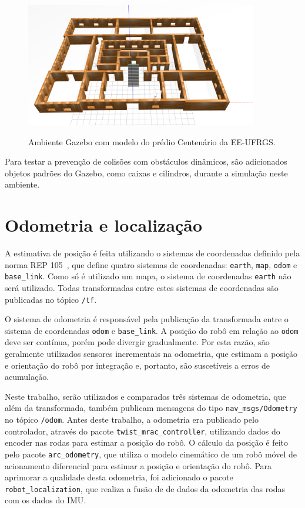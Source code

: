 \documentclass[repeatfields,xlists,xpacks,oneside,yearsonly]{ufrgscca}
\begin{document}
\begin{figure}[h]
    {
        \centering
        \caption{Ambiente Gazebo com modelo do prédio Centenário da EE-UFRGS.}
        \label{fig:gazebo_centenario}
        \includegraphics[width=0.9\textwidth]{gazebo.png}\\
    }
\end{figure}

Para testar a prevenção de colisões com obstáculos dinâmicos, são
adicionados objetos padrões do Gazebo, como caixas e cilindros,
durante a simulação neste ambiente.

\section{Odometria e localização}

A estimativa de posição é feita utilizando o sistemas de coordenadas definido pela
norma REP 105~\cite{rep_105}, que define quatro sistemas de coordenadas: \texttt{earth}, 
\texttt{map}, \texttt{odom} e \texttt{base\_link}.
Como só é utilizado um mapa, o sistema de coordenadas \texttt{earth} não será utilizado.
Todas transformadas entre estes sistemas de coordenadas são
publicadas no tópico \texttt{/tf}.

O sistema de odometria é responsável pela publicação da transformada entre o sistema
de coordenadas \texttt{odom} e \texttt{base\_link}. 
A posição do robô em relação ao \texttt{odom} deve ser contínua, porém pode divergir
gradualmente. Por esta razão, são geralmente utilizados sensores incrementais na 
odometria, que estimam a posição e orientação do robô por integração e, portanto,
são suscetíveis a erros de acumulação.

Neste trabalho, serão utilizados e comparados três sistemas de odometria, 
que além da transformada, também publicam mensagens do tipo 
\texttt{nav\_msgs/Odometry} no tópico \texttt{/odom}.
Antes deste trabalho, a odometria era publicado pelo controlador,
através do pacote \texttt{twist\_mrac\_controller}, utilizando 
dados do encoder nas rodas para estimar a posição do robô.
O cálculo da posição é feito pelo pacote \texttt{arc\_odometry}, que utiliza
o modelo cinemático de um robô móvel de acionamento diferencial 
para estimar a posição e orientação do robô.
Para aprimorar a qualidade desta odometria, foi adicionado o pacote 
\texttt{robot\_localization}, que realiza a fusão de 
de dados da odometria das rodas com os dados do IMU.
\end{document}
